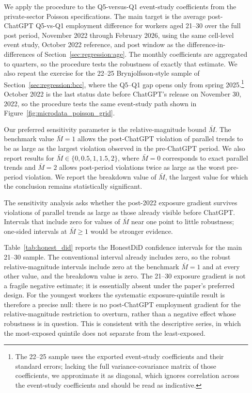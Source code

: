 \documentclass[12pt]{article}
\begin{document}
We apply the procedure to the Q5-versus-Q1 event-study coefficients from the private-sector Poisson specifications. The main target is the average post-ChatGPT Q5-vs-Q1 employment difference for workers aged 21--30 over the full post period, November 2022 through February 2026, using the same cell-level event study, October 2022 reference, and post window as the difference-in-differences of Section~\ref{sec:regression:age}. The monthly coefficients are aggregated to quarters, so the procedure tests the robustness of exactly that estimate. We also repeat the exercise for the 22--25 Brynjolfsson-style sample of Section~\ref{sec:regression:bcc}, where the Q5--Q1 gap opens only from spring 2025.\footnote{The 22--25 sample uses the exported event-study coefficients and their standard errors; lacking the full variance-covariance matrix of those coefficients, we approximate it as diagonal, which ignores correlation across the event-study coefficients and should be read as indicative.} October 2022 is the last status date before ChatGPT's release on November 30, 2022, so the procedure tests the same event-study path shown in Figure~\ref{fig:microdata_poisson_grid}.

Our preferred sensitivity parameter is the relative-magnitude bound $\bar{M}$. The benchmark value $\bar{M}=1$ allows the post-ChatGPT violation of parallel trends to be as large as the largest violation observed in the pre-ChatGPT period. We also report results for $\bar{M}\in\{0,0.5,1,1.5,2\}$, where $\bar{M}=0$ corresponds to exact parallel trends and $\bar{M}=2$ allows post-period violations twice as large as the worst pre-period violation. We report the breakdown value of $\bar{M}$, the largest value for which the conclusion remains statistically significant.

The sensitivity analysis asks whether the post-2022 exposure gradient survives violations of parallel trends as large as those already visible before ChatGPT. Intervals that include zero for values of $\bar{M}$ near one point to little robustness; one-sided intervals at $\bar{M}\geq 1$ would be stronger evidence.

Table~\ref{tab:honest_did} reports the HonestDiD confidence intervals for the main 21--30 sample. The conventional interval already includes zero, so the robust relative-magnitude intervals include zero at the benchmark $\bar{M}=1$ and at every other value, and the breakdown value is zero. The 21--30 exposure gradient is not a fragile negative estimate; it is essentially absent under the paper's preferred design. For the youngest workers the systematic exposure-quintile result is therefore a precise null: there is no post-ChatGPT employment gradient for the relative-magnitude restriction to overturn, rather than a negative effect whose robustness is in question. This is consistent with the descriptive series, in which the most-exposed quintile does not separate from the least-exposed.
\end{document}
